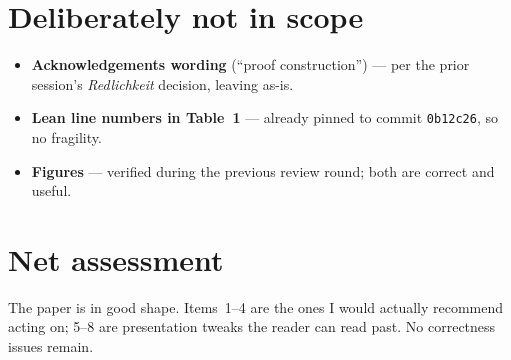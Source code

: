 \documentclass[11pt]{article}
\begin{document}
\section*{Deliberately not in scope}

\begin{itemize}
    \item \textbf{Acknowledgements wording} (``proof construction'') ---
    per the prior session's \emph{Redlichkeit} decision, leaving as-is.
    \item \textbf{Lean line numbers in Table~1} --- already pinned to
    commit \texttt{0b12c26}, so no fragility.
    \item \textbf{Figures} --- verified during the previous review
    round; both are correct and useful.
\end{itemize}

\section*{Net assessment}

The paper is in good shape.  Items~1--4 are the ones I would actually
recommend acting on; 5--8 are presentation tweaks the reader can read
past.  No correctness issues remain.
\end{document}
